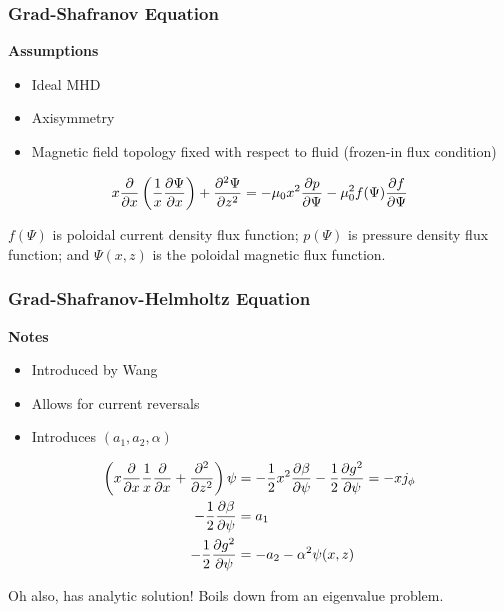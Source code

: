 \documentclass{beamer}
\begin{document}
\begin{frame}
\frametitle{Grad-Shafranov Equation}

\textbf{Assumptions}
\begin{itemize}
    \item Ideal MHD
    \item Axisymmetry
    \item Magnetic field topology fixed with respect to fluid (frozen-in flux condition)
\end{itemize}

\begin{equation*}
    x \pdv{x} \left ( \frac{1}{x} \pdv{\Psi}{x} \right ) + \pdv[2]{\Psi}{z} = -\mu_0 x^2 \pdv{p}{\Psi} - \mu_0^2 f(\Psi)\pdv{f}{\Psi}
\end{equation*}

$f(\Psi)$ is poloidal current density flux function; $p(\Psi)$ is pressure density flux function; and $\Psi(x,z)$ is the poloidal 
magnetic flux function.

\end{frame}















\begin{frame}
\frametitle{Grad-Shafranov-Helmholtz Equation}

\textbf{Notes}
\begin{itemize}
    \item Introduced by Wang
    \item Allows for current reversals
    \item Introduces $(a_1, a_2, \alpha)$
\end{itemize}

\begin{align*}
   \left ( x \pdv{x} \frac{1}{x} \pdv{x} + \pdv[2]{z} \right ) \psi &= -\frac{1}{2} x^2 \pdv{\beta}{\psi} - \frac{1}{2} \pdv{g^2}{\psi} = -xj_{\phi} \\
   -\frac{1}{2}\pdv{\beta}{\psi} &= a_1 \\
   -\frac{1}{2}\pdv{g^2}{\psi} &= -a_2 - \alpha^2 \psi (x, z)
\end{align*}

Oh also, has analytic solution! Boils down from an eigenvalue problem.

\end{frame}
\end{document}
